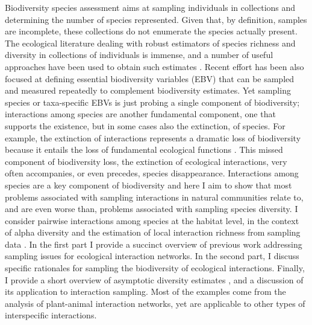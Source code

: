 \documentclass[12pt]{article}
\begin{document}
\linenumbers
Biodiversity species assessment aims at sampling individuals in collections and determining the number of species represented. Given that, by definition, samples are incomplete, these collections do not enumerate the species actually present. The ecological literature dealing with robust estimators of species richness and diversity in collections of individuals is immense, and a number of useful approaches have been used to obtain such estimates \citep{Magurran:1988mm,Gotelli:2001uo,Colwell:2004fi,Hortal:2006dc,Colwell:2009gv,Gotelli:2011tb,Chao:2014wm}. Recent effort has been also focused at defining essential biodiversity variables (EBV) \citep{Pereira:2013ji} that can be sampled and measured repeatedly to complement biodiversity estimates. Yet sampling species or taxa-specific EBVs is just probing a single component of biodiversity; interactions among species are another fundamental component, one that supports the existence, but in some cases also the extinction, of species. For example, the extinction of interactions represents a dramatic loss of biodiversity because it entails the loss of fundamental ecological functions \citep{ValienteBanuet:2014bw}. This missed component of biodiversity loss, the extinction of ecological interactions, very often accompanies, or even precedes, species disappearance. Interactions among species are a key component of biodiversity and here I aim to show that most problems associated with sampling interactions in natural communities relate to, and are even worse than, problems associated with sampling species diversity. I consider pairwise interactions among species at the habitat level, in the context of alpha diversity and the estimation of local interaction richness from sampling data \citep{Chao:2014wm}. In the first part I provide a succinct overview of previous work addressing sampling issues for ecological interaction networks. In the second part, I discuss specific rationales for sampling the biodiversity of ecological interactions. Finally, I provide a short overview of asymptotic diversity estimates \citep{Gotelli:2001uo}, and a discussion of its application to interaction sampling. Most of the examples come from the analysis of plant-animal interaction networks, yet are applicable to other types of interspecific interactions.
\end{document}
